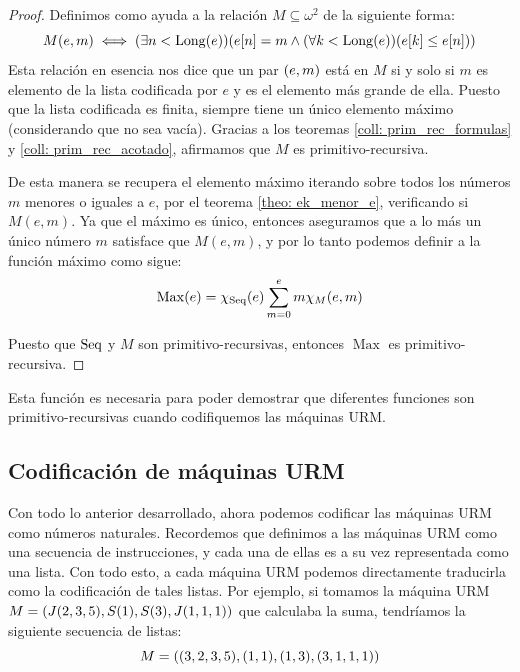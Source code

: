 \begin{proof}
	Definimos como ayuda a la relación $M\subseteq\omega^{2}$ de la siguiente forma:
	\[
		M\pa*{e, m}\iff\pa*{\exists n <\LONGITUD\pa*{e}}\pa*{e\bra*{n} = m\land\pa*{\forall k <\LONGITUD\pa*{e}}\pa*{e\bra*{k}\leq e\bra*{n}}}
	\]
	Esta relación en esencia nos dice que un par $\pa*{e, m}$ está en $M$ si y solo si $m$ es elemento de la lista codificada por $e$ y es el elemento más grande de ella. Puesto que la lista codificada es finita, siempre tiene un único elemento máximo (considerando que no sea vacía). Gracias a los teoremas \ref{coll: prim_rec_formulas} y \ref{coll: prim_rec_acotado}, afirmamos que $M$ es primitivo-recursiva.

	De esta manera se recupera el elemento máximo iterando sobre todos los números $m$ menores o iguales a $e$, por el teorema \ref{theo: ek_menor_e}, verificando si $M(e, m)$. Ya que el máximo es único, entonces aseguramos que a lo más un único número $m$ satisface que $M(e, m)$, y por lo tanto podemos definir a la función máximo como sigue:
	\[
		\operatorname{Max}\pa*{e} =\CARACTERISTICA{\SECUENCIAS}\pa*{e}\sum_{m = 0}^{e}m\CARACTERISTICA{M}\pa*{e, m}
	\]

	Puesto que $\SECUENCIAS$ y $M$ son primitivo-recursivas, entonces $\operatorname{Max}$ es primitivo-recursiva.
\end{proof}

Esta función es necesaria para poder demostrar que diferentes funciones son primitivo-recursivas cuando codifiquemos las máquinas URM.
\subsection{Codificación de máquinas URM}

Con todo lo anterior desarrollado, ahora podemos codificar las máquinas URM como números naturales. Recordemos que definimos a las máquinas URM como una secuencia de instrucciones, y cada una de ellas es a su vez representada como una lista. Con todo esto, a cada máquina URM podemos directamente traducirla como la codificación de tales listas. Por ejemplo, si tomamos la máquina URM $M =\pa*{J\pa*{2, 3, 5},S\pa*{1}, S\pa*{3},  J\pa*{1, 1, 1}}$ que calculaba la suma, tendríamos la siguiente secuencia de listas:
\[
	M =\pa*{\pa*{3, 2, 3, 5},\pa*{1, 1},\pa*{1, 3},\pa*{3, 1, 1, 1}}
\]

